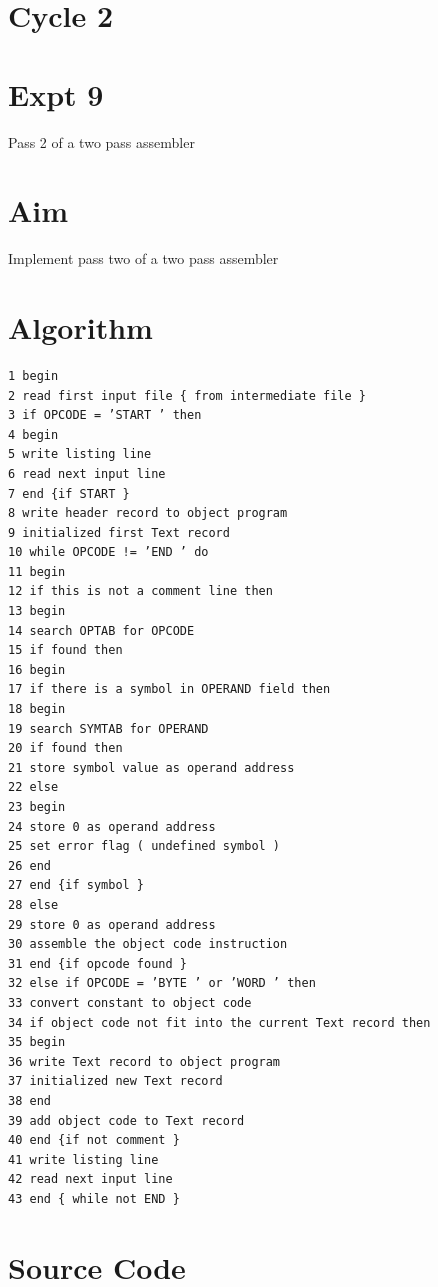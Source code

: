 \documentclass[13pt,oneside]{book}
\begin{document}
\section*{Cycle 2}
\section*{Expt 9}
\begin{center}
    \Large{Pass 2 of a two pass assembler}
\end{center}
\section*{Aim}
\large
Implement pass two of a two pass assembler

\section*{Algorithm} 
    \begin{verbatim}
1 begin
2 read first input file { from intermediate file }
3 if OPCODE = ’START ’ then
4 begin
5 write listing line
6 read next input line
7 end {if START }
8 write header record to object program
9 initialized first Text record
10 while OPCODE != ’END ’ do
11 begin
12 if this is not a comment line then
13 begin
14 search OPTAB for OPCODE
15 if found then
16 begin
17 if there is a symbol in OPERAND field then
18 begin
19 search SYMTAB for OPERAND
20 if found then
21 store symbol value as operand address
22 else
23 begin
24 store 0 as operand address
25 set error flag ( undefined symbol )
26 end
27 end {if symbol }
28 else
29 store 0 as operand address
30 assemble the object code instruction
31 end {if opcode found }
32 else if OPCODE = ’BYTE ’ or ’WORD ’ then
33 convert constant to object code
34 if object code not fit into the current Text record then
35 begin
36 write Text record to object program
37 initialized new Text record
38 end
39 add object code to Text record
40 end {if not comment }
41 write listing line
42 read next input line
43 end { while not END }
	\end{verbatim}

\section*{Source Code}
\small
\end{document}
